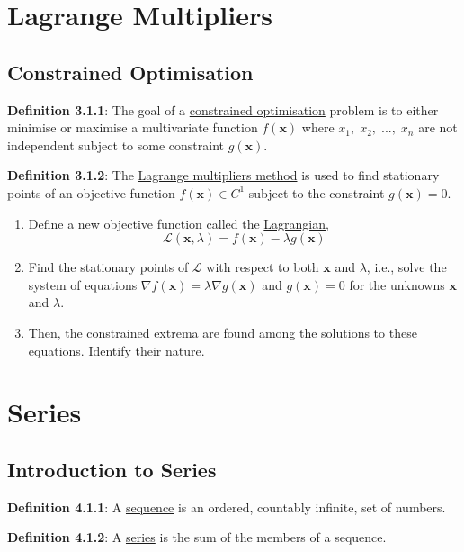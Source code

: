 \documentclass{article}
\newcommand{\separate}[1] {\vspace{#1 pt}\noindent}
\newcommand{\lagrange}{\mathcal{L}}
\newcommand{\definition}[2]{\textbf{Definition #1}: #2\label{def:#1}}
\begin{document}
\section{Lagrange Multipliers}

\subsection{Constrained Optimisation}

\definition{3.1.1}{The goal of a \underline{constrained optimisation} problem is to either minimise or maximise a multivariate function \(f(\mathbf{x})\) where \(x_1,\;x_2,\;...,\;x_n\) are not independent subject to some constraint \(g(\mathbf{x})\).}

\separate{7}\definition{3.1.2}{The \underline{Lagrange multipliers method} is used to find stationary points of an objective function \(f(\mathbf{x}) \in C^1\) subject to the constraint \(g(\mathbf{x}) = 0\).
\begin{enumerate}
    \item Define a new objective function called the \underline{Lagrangian},
    \begin{equation}
        \lagrange(\mathbf{x}, \lambda) = f(\mathbf{x}) - \lambda g(\mathbf{x})
    \end{equation}
    \item Find the stationary points of \(\lagrange\) with respect to both \(\mathbf{x}\) and \(\lambda\), i.e., solve the system of equations \(\nabla f(\mathbf{x}) = \lambda\nabla g(\mathbf{x})\) and \(g(\mathbf{x}) = 0\) for the unknowns \(\mathbf{x}\) and \(\lambda\).
    \item Then, the constrained extrema are found among the solutions to these equations. Identify their nature.
\end{enumerate}
}

\section{Series}

\subsection{Introduction to Series}

\definition{4.1.1}{A \underline{sequence} is an ordered, countably infinite, set of numbers.}

\separate{7}\definition{4.1.2}{A \underline{series} is the sum of the members of a sequence.}
\end{document}
